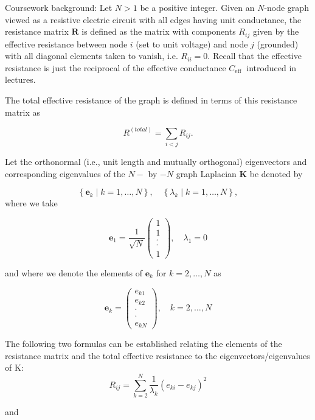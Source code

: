 \documentclass[10pt, a4paper]{article}
\begin{document}
\newpage
\begin{Problem}
Coursework background: Let $N>1$ be a positive integer. Given an $N$-node graph viewed as a resistive electric circuit with all edges having unit conductance, the resistance matrix $\mathbf{R}$ is defined as the matrix with components $R_{i j}$ given by the effective resistance between node $i$ (set to unit voltage) and node $j$ (grounded) with all diagonal elements taken to vanish, i.e. $R_{i i}=0$. Recall that the effective resistance is just the reciprocal of the effective conductance $C_{\text {eff }}$ introduced in lectures.

The total effective resistance of the graph is defined in terms of this resistance matrix as

$$
R^{(total)}=\sum_{i<j} R_{i j} .
$$

Let the orthonormal (i.e., unit length and mutually orthogonal) eigenvectors and corresponding eigenvalues of the $N-$ by $-N$ graph Laplacian $\mathbf{K}$ be denoted by

$$
\left\{\mathbf{e}_{k} \mid k=1, \ldots, N\right\}, \quad\left\{\lambda_{k} \mid k=1, \ldots, N\right\},
$$
where we take

$$
\mathbf{e}_{1}=\frac{1}{\sqrt{N}}\left(\begin{array}{c}
1 \\
1 \\
. \\
\cdot \\
1
\end{array}\right), \quad \lambda_{1}=0
$$

and where we denote the elements of $\mathbf{e}_{k}$ for $k=2, \ldots, N$ as

$$
\mathbf{e}_{k}=\left(\begin{array}{r}
e_{k 1} \\
e_{k 2} \\
\cdot \\
\cdot \\
e_{k N}
\end{array}\right), \quad k=2, \ldots, N
$$

The following two formulas can be established relating the elements of the resistance matrix and the total effective resistance to the eigenvectors/eigenvalues of K: 
\begin{equation*}
R_{i j}=\sum_{k=2}^{N} \frac{1}{\lambda_{k}}\left(e_{k i}-e_{k j}\right)^{2}
\end{equation*}

and


\end{Problem}
\end{document}
